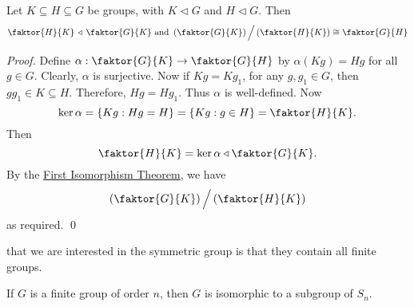 \begin{thm}
\label{thm:third_isomorphism_theorem}
  Let $K \subseteq H \subseteq G$ be groups, with $K \triangleleft G$ and $H \triangleleft G$. Then
  \begin{equation*}
    \faktor{H}{K} \, \triangleleft \, \faktor{G}{K} \text{ and } \left( \faktor{G}{K} \right) \Big/ \left( \faktor{H}{K} \right) \cong \faktor{G}{H}
  \end{equation*}
\end{thm}

\begin{proof}
  Define $\alpha : \faktor{G}{K} \to \faktor{G}{H}$ by $\alpha(Kg) = Hg$ for all $g \in G$. Clearly, $\alpha$ is surjective. Now if $Kg = Kg_1$, for any $g, g_1 \in G$, then $gg_1 \in K \subseteq H$. Therefore, $Hg = Hg_1$. Thus $\alpha$ is well-defined. Now
  \begin{equation*}
    \ker \alpha = \{Kg : Hg = H \} = \{ Kg : g \in H \} = \faktor{H}{K}.
  \end{equation*}
  Then
  \begin{equation*}
    \faktor{H}{K} = \ker \alpha \triangleleft \faktor{G}{K}.
  \end{equation*}
  By the \hyperref[thm:first_isomorphism_theorem]{First Isomorphism Theorem}, we have
  \begin{equation*}
    \left( \faktor{G}{K} \right) \Big/ \left( \faktor{H}{K} \right)
  \end{equation*}
  as required. \qed
\end{proof}



 that we are interested in the symmetric group is that they contain all finite groups.

\begin{thmnonum}
  If $G$ is a finite group of order $n$, then $G$ is isomorphic to a subgroup of $S_n$.
\end{thmnonum}

